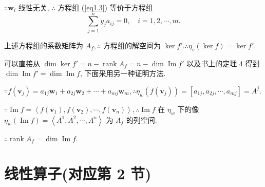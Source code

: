\documentclass{ctexart}
\begin{document}
$\because\boldsymbol{w}_i$ 线性无关, $\therefore$ 方程组 (\ref{eq1.3}) 等价于方程组
\[\sum\limits_{j=1}^ny_ja_{ij}=0,\quad i=1,2,\cdots,m.\]

上述方程组的系数矩阵为 $A_f,\therefore$ 方程组的解空间为 $\ker f'.\therefore\eta_v(\ker f)=\ker f'$.

可以直接从 $\dim\ker f'=n-\operatorname{rank}A_f=n-\dim\operatorname{Im}f'$ 以及书上的定理 4 得到 $\dim\operatorname{Im}f'=\dim\operatorname{Im}f$, 下面采用另一种证明方法.

$\because f(\boldsymbol{v}_j)=a_{1j}\boldsymbol{w}_1+a_{2j}\boldsymbol{w}_2+\cdots+a_{mj}\boldsymbol{w}_m,\therefore\eta_w(f(\boldsymbol{v}_j))=[a_{1j},a_{2j},\cdots,a_{mj}]=A^{j}$.

$\because\operatorname{Im}f=\left<f(\boldsymbol{v}_1),f(\boldsymbol{v}_2),\cdots,f(\boldsymbol{v}_n)\right>,\therefore\operatorname{Im}f$ 在 $\eta_w$ 下的像 $\eta_w(\operatorname{Im}f)=\left<A^{1},A^{2},\cdots,A^{n}\right>$ 为 $A_f$ 的列空间.

$\therefore\operatorname{rank}A_f=\dim\operatorname{Im}f$.
\section{线性算子(对应第 2 节)}
\end{document}
